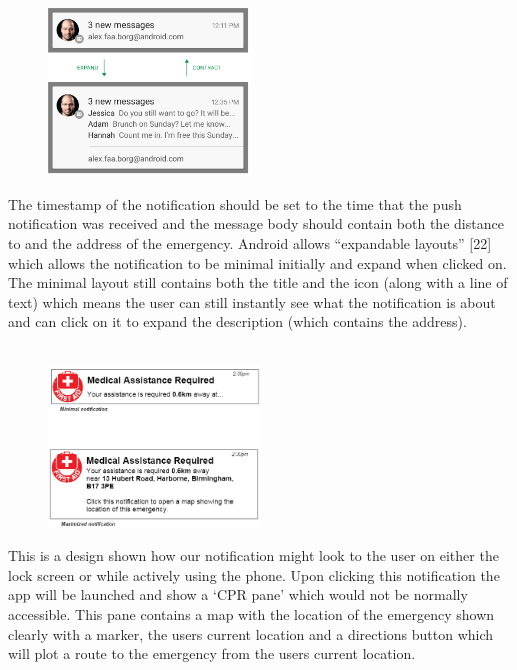 \documentclass{article}
\begin{document}
\begin{figure}
  \begin{center}
    \includegraphics[width=0.48\textwidth]{"Iteration1/Android Notification Layout Extended"}
  \end{center}
\end{figure}
The timestamp of the notification should be set to the time that the push notification was received and the message body should contain both the distance to and the address of the emergency. Android allows “expandable layouts” [22] which allows the notification to be minimal initially and expand when clicked on. The minimal layout still contains both the title and the icon (along with a line of text) which means the user can still instantly see what the notification is about and can click on it to expand the description (which contains the address). \\\\

\begin{figure}
  \begin{center}
		\includegraphics[width=0.5\textwidth]{"Iteration1/Android Notification Design"}  \end{center}
\end{figure}
	This is a design shown how our notification might look to the user on either the lock screen or while actively using the phone. Upon clicking this notification the app will be launched and show a ‘CPR pane’ which would not be normally accessible. This pane contains a map with the location of the emergency shown clearly with a marker, the users current location and a directions button which will plot a route to the emergency from the users current location.\\\\\\
	
\end{document}

